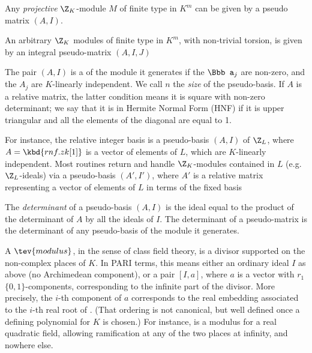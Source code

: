 \item Any \emph{projective} $\Z_K$-module $M$
of finite type in $K^m$ can be given by a pseudo matrix $(A,I)$.

\item An arbitrary $\Z_K$ modules of finite type in $K^m$, with non-trivial
torsion, is given by an integral pseudo-matrix $(A,I,J)$


\item The pair $(A,I)$ is a  of the module it
generates if the ${\Bbb a_j}$ are non-zero, and the $A_j$ are $K$-linearly
independent. We call $n$ the \emph{size} of the pseudo-basis. If $A$ is a
relative matrix, the latter condition means it is square with non-zero
determinant; we say that it is in Hermite Normal Form (HNF) if it is upper triangular and all the elements of the diagonal
are equal to 1.

\item For instance, the relative integer basis  is a pseudo-basis
$(A,I)$ of $\Z_L$, where $A = \kbd{rnf.zk[1]}$ is a vector of elements of $L$,
which are $K$-linearly independent. Most  routines return and handle
$\Z_K$-modules contained in $L$ (e.g.~$\Z_L$-ideals) via a pseudo-basis
$(A',I')$, where $A'$ is a relative matrix representing a vector of elements of
$L$ in terms of the fixed basis 

\item The \emph{determinant} of a pseudo-basis $(A,I)$ is the ideal
equal to the product of the determinant of $A$ by all the ideals of $I$. The
determinant of a pseudo-matrix is the determinant of any pseudo-basis of the
module it generates.

\label{se:CFT}

A $\tev{modulus}$, in the sense of class field theory, is a divisor supported
on the non-complex places of $K$. In PARI terms, this means either an
ordinary ideal $I$ as above (no Archimedean component), or a pair $[I,a]$,
where $a$ is a vector with $r_1$ $\{0,1\}$-components, corresponding to the
infinite part of the divisor. More precisely, the $i$-th component of $a$
corresponds to the real embedding associated to the $i$-th real root of
. (That ordering is not canonical, but well defined once a
defining polynomial for $K$ is chosen.) For instance, \kbd{[1, [1,1]]} is a
modulus for a real quadratic field, allowing ramification at any of the two
places at infinity, and nowhere else.

